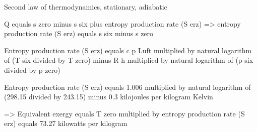 Second law of thermodynamics, stationary, adiabatic  

Q equals s zero minus s six plus entropy production rate (S erz)  
=> entropy production rate (S erz) equals s six minus s zero  

Entropy production rate (S erz) equals c p Luft multiplied by natural logarithm of (T six divided by T zero) minus R h multiplied by natural logarithm of (p six divided by p zero)  

Entropy production rate (S erz) equals 1.006 multiplied by natural logarithm of (298.15 divided by 243.15) minus 0.3 kilojoules per kilogram Kelvin  

=> Equivalent exergy equals T zero multiplied by entropy production rate (S erz) equals 73.27 kilowatts per kilogram